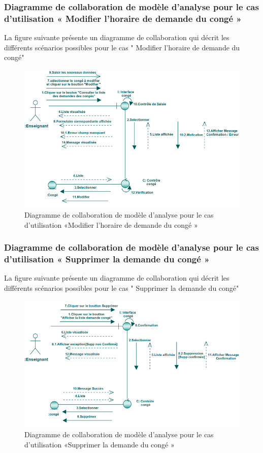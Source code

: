 \documentclass[12 pt]{report}
\begin{document}
\subsubsection{Diagramme  de  collaboration  de  modèle  d'analyse  pour  le  cas  d'utilisation « Modifier l'horaire de  demande du  congé »  }
La figure suivante présente un diagramme de collaboration qui décrit les différents
scénarios possibles pour le cas " Modifier l'horaire de   demande du  congé"
\begin{figure}[h]
\begin{center}
\includegraphics[width= 14cm , height =5.4 cm]{colla_ens_modifierconge.PNG}
 \caption{Diagramme  de  collaboration  de  modèle  d'analyse  pour  le  cas  d'utilisation «Modifier l'horaire de   demande du  congé »}
\end{center}
\end{figure}
\subsubsection{Diagramme  de  collaboration  de  modèle  d'analyse  pour  le  cas  d'utilisation « Supprimer  la demande du  congé »  }
La figure suivante présente un diagramme de collaboration qui décrit les différents
scénarios possibles pour le cas " Supprimer  la demande du  congé"
\begin{figure}[h]
\begin{center}
\includegraphics[width= 14cm , height =5 cm]{colla_ens_supprimerdemandeconge.png}
 \caption{Diagramme  de  collaboration  de  modèle  d'analyse  pour  le  cas  d'utilisation «Supprimer  la demande du congé »}
\end{center}
\end{figure}
\end{document}
